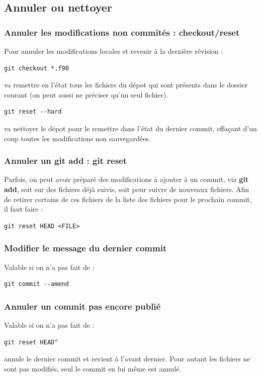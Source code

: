 \documentclass[a4paper,twoside]{article}
\begin{document}
\subsection{Annuler ou nettoyer}
\subsubsection{Annuler les modifications non commités : checkout/reset}
Pour annuler les modifications locales et revenir à la dernière révision : 
\begin{verbatim}
git checkout *.f90
\end{verbatim}
va remettre en l'état tous les fichiers du dépot qui sont présents dans le dossier courant (on peut aussi ne préciser qu'un seul fichier).

\bigskip

\begin{verbatim}
git reset --hard
\end{verbatim}
va nettoyer le dépot pour le remettre dans l'état du dernier commit, effaçant d'un coup toutes les modifications non sauvegardées.

\subsubsection{Annuler un git add : git reset}
Parfois, on peut avoir préparé des modifications à ajouter à un commit, via \textbf{git add}, soit sur des fichiers déjà suivis, soit pour suivre de nouveaux fichiers. Afin de retirer certains de ces fichiers de la liste des fichiers pour le prochain commit, il faut faire :
\begin{verbatim}
git reset HEAD <FILE>
\end{verbatim}

\subsubsection{Modifier le message du dernier commit}
Valable si on n'a pas fait de  :
\begin{verbatim}
git commit --amend
\end{verbatim}

\subsubsection{Annuler un commit pas encore publié}
Valable si on n'a pas fait de  :
\begin{verbatim}
git reset HEAD^
\end{verbatim}
annule le dernier commit et revient à l'avant dernier. Pour autant les fichiers ne sont pas modifiés, seul le commit en lui même est annulé.
\end{document}
